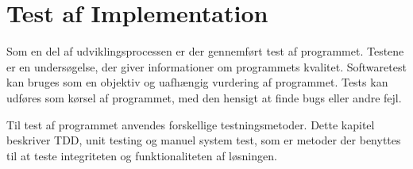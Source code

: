 \chapter{Test af Implementation}

Som en del af udviklingsprocessen er der gennemført test af programmet. Testene er en undersøgelse, der giver informationer om programmets kvalitet. Softwaretest kan bruges som en objektiv og uafhængig vurdering af programmet. Tests kan udføres som kørsel af programmet, med den hensigt at finde bugs eller andre fejl.

Til test af programmet anvendes forskellige testningsmetoder. Dette kapitel beskriver TDD, unit testing og manuel system test, som er metoder der benyttes til at teste integriteten og funktionaliteten af løsningen.




